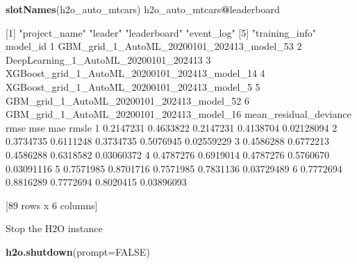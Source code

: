 \documentclass[
]{book}
\newenvironment{Shaded}{\begin{snugshade}}{\end{snugshade}}
\newcommand{\DataTypeTok}[1]{\textcolor[rgb]{0.13,0.29,0.53}{#1}}
\newcommand{\DecValTok}[1]{\textcolor[rgb]{0.00,0.00,0.81}{#1}}
\newcommand{\FloatTok}[1]{\textcolor[rgb]{0.00,0.00,0.81}{#1}}
\newcommand{\KeywordTok}[1]{\textcolor[rgb]{0.13,0.29,0.53}{\textbf{#1}}}
\newcommand{\NormalTok}[1]{#1}
\newcommand{\OperatorTok}[1]{\textcolor[rgb]{0.81,0.36,0.00}{\textbf{#1}}}
\newcommand{\OtherTok}[1]{\textcolor[rgb]{0.56,0.35,0.01}{#1}}
\newcommand{\StringTok}[1]{\textcolor[rgb]{0.31,0.60,0.02}{#1}}
\begin{document}
\begin{Shaded}
\begin{Highlighting}[]
\KeywordTok{slotNames}\NormalTok{(h2o_auto_mtcars)}
\NormalTok{h2o_auto_mtcars}\OperatorTok{@}\NormalTok{leaderboard}

\NormalTok{[}\DecValTok{1}\NormalTok{] }\StringTok{"project_name"}  \StringTok{"leader"}        \StringTok{"leaderboard"}   \StringTok{"event_log"}    
\NormalTok{[}\DecValTok{5}\NormalTok{] }\StringTok{"training_info"}
\NormalTok{                                        model_id}
\DecValTok{1}\NormalTok{     GBM_grid_}\DecValTok{1}\NormalTok{_AutoML_}\DecValTok{20200101}\NormalTok{_}\DecValTok{202413}\NormalTok{_model_}\DecValTok{53}
\DecValTok{2}\NormalTok{          DeepLearning_}\DecValTok{1}\NormalTok{_AutoML_}\DecValTok{20200101}\NormalTok{_}\DecValTok{202413}
\DecValTok{3}\NormalTok{ XGBoost_grid_}\DecValTok{1}\NormalTok{_AutoML_}\DecValTok{20200101}\NormalTok{_}\DecValTok{202413}\NormalTok{_model_}\DecValTok{14}
\DecValTok{4}\NormalTok{  XGBoost_grid_}\DecValTok{1}\NormalTok{_AutoML_}\DecValTok{20200101}\NormalTok{_}\DecValTok{202413}\NormalTok{_model_}\DecValTok{5}
\DecValTok{5}\NormalTok{     GBM_grid_}\DecValTok{1}\NormalTok{_AutoML_}\DecValTok{20200101}\NormalTok{_}\DecValTok{202413}\NormalTok{_model_}\DecValTok{52}
\DecValTok{6}\NormalTok{     GBM_grid_}\DecValTok{1}\NormalTok{_AutoML_}\DecValTok{20200101}\NormalTok{_}\DecValTok{202413}\NormalTok{_model_}\DecValTok{16}
\NormalTok{  mean_residual_deviance      rmse       mse       mae      rmsle}
\DecValTok{1}              \FloatTok{0.2147231} \FloatTok{0.4633822} \FloatTok{0.2147231} \FloatTok{0.4138704} \FloatTok{0.02128094}
\DecValTok{2}              \FloatTok{0.3734735} \FloatTok{0.6111248} \FloatTok{0.3734735} \FloatTok{0.5076945} \FloatTok{0.02559229}
\DecValTok{3}              \FloatTok{0.4586288} \FloatTok{0.6772213} \FloatTok{0.4586288} \FloatTok{0.6318582} \FloatTok{0.03060372}
\DecValTok{4}              \FloatTok{0.4787276} \FloatTok{0.6919014} \FloatTok{0.4787276} \FloatTok{0.5760670} \FloatTok{0.03091116}
\DecValTok{5}              \FloatTok{0.7571985} \FloatTok{0.8701716} \FloatTok{0.7571985} \FloatTok{0.7831136} \FloatTok{0.03729489}
\DecValTok{6}              \FloatTok{0.7772694} \FloatTok{0.8816289} \FloatTok{0.7772694} \FloatTok{0.8020415} \FloatTok{0.03896093}

\NormalTok{[}\DecValTok{89}\NormalTok{ rows x }\DecValTok{6}\NormalTok{ columns] }
\end{Highlighting}
\end{Shaded}

Stop the H2O instance

\begin{Shaded}
\begin{Highlighting}[]
\KeywordTok{h2o.shutdown}\NormalTok{(}\DataTypeTok{prompt=}\OtherTok{FALSE}\NormalTok{)}
\end{Highlighting}
\end{Shaded}

  
\end{document}
